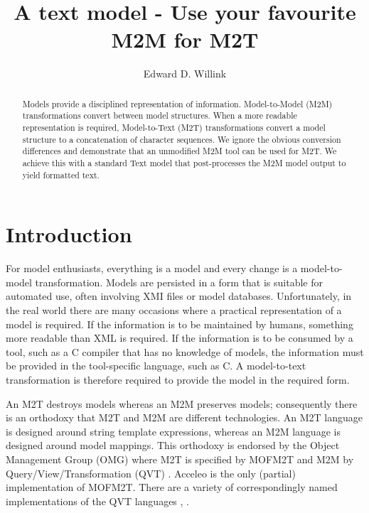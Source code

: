 \documentclass{llncs}
\begin{document}
%
\mainmatter              %
%
\title{A text model - Use your favourite M2M for M2T}
%
%
\author{Edward D. Willink}
%
%
%


\maketitle              %

\begin{abstract}
Models provide a disciplined representation of information. Model-to-Model (M2M) transformations convert between model structures. When a more readable representation is required, Model-to-Text (M2T) transformations convert a model structure to a concatenation of character sequences. We ignore the obvious conversion differences and demonstrate that an unmodified M2M tool can be used for M2T. We achieve this with a standard Text model that post-processes the M2M model output to yield formatted text. 
\end{abstract}
%
\section{Introduction}
%
For model enthusiasts, everything is a model and every change is a model-to-model transformation. Models are persisted in a form that is suitable for automated use, often involving XMI files or model databases. Unfortunately, in the real world there are many occasions where a practical representation of a model is required. If the information is to be maintained by humans, something more readable than XML is required. If the information is to be consumed by a tool, such as a C compiler that has no knowledge of models, the information must be provided in the tool-specific language, such as C. A model-to-text transformation is therefore required to provide the model in the required form.

An M2T destroys models whereas an M2M preserves models; consequently there is an orthodoxy that M2T and M2M are different technologies. An M2T language is designed around string template expressions, whereas an M2M language is designed around model mappings. This orthodoxy is endorsed by the Object Management Group (OMG) where M2T is specified by MOFM2T \cite{MOFM2T-1.0} and M2M by Query/View/Transformation (QVT) \cite{QVT-1.3}. Acceleo \cite{Eclipse-Acceleo} is the only (partial) implementation of MOFM2T. There are a variety of correspondingly named implementations of the QVT languages \cite{Eclipse-QVTd}, \cite{Eclipse-QVTo}. 
\end{document}

